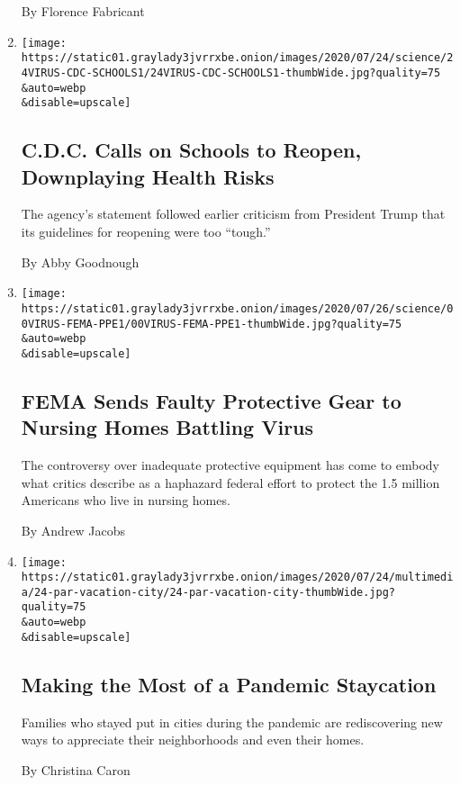 \begin{enumerate}
  By Florence Fabricant
\item
  \href{/2020/07/24/health/cdc-schools-coronavirus.html}{}

  \texttt{[image: https://static01.graylady3jvrrxbe.onion/images/2020/07/24/science/24VIRUS-CDC-SCHOOLS1/24VIRUS-CDC-SCHOOLS1-thumbWide.jpg?quality=75\\\&auto=webp\\\&disable=upscale]}

  \hypertarget{cdc-calls-on-schools-to-reopen-downplaying-health-risks}{%
  \subsection{C.D.C. Calls on Schools to Reopen, Downplaying Health
  Risks}\label{cdc-calls-on-schools-to-reopen-downplaying-health-risks}}

  The agency's statement followed earlier criticism from President Trump
  that its guidelines for reopening were too ``tough.''

  By Abby Goodnough
\item
  \href{/2020/07/24/health/coronavirus-nursing-homes-PPE.html}{}

  \texttt{[image: https://static01.graylady3jvrrxbe.onion/images/2020/07/26/science/00VIRUS-FEMA-PPE1/00VIRUS-FEMA-PPE1-thumbWide.jpg?quality=75\\\&auto=webp\\\&disable=upscale]}

  \hypertarget{fema-sends-faulty-protective-gear-to-nursing-homes-battling-virus}{%
  \subsection{FEMA Sends Faulty Protective Gear to Nursing Homes
  Battling
  Virus}\label{fema-sends-faulty-protective-gear-to-nursing-homes-battling-virus}}

  The controversy over inadequate protective equipment has come to
  embody what critics describe as a haphazard federal effort to protect
  the 1.5 million Americans who live in nursing homes.

  By Andrew Jacobs
\item
  \href{/2020/07/24/parenting/summer-staycation-coronavirus.html}{}

  \texttt{[image: https://static01.graylady3jvrrxbe.onion/images/2020/07/24/multimedia/24-par-vacation-city/24-par-vacation-city-thumbWide.jpg?quality=75\\\&auto=webp\\\&disable=upscale]}

  \hypertarget{making-the-most-of-a-pandemic-staycation}{%
  \subsection{Making the Most of a Pandemic
  Staycation}\label{making-the-most-of-a-pandemic-staycation}}

  Families who stayed put in cities during the pandemic are
  rediscovering new ways to appreciate their neighborhoods and even
  their homes.

  By Christina Caron
\end{enumerate}


